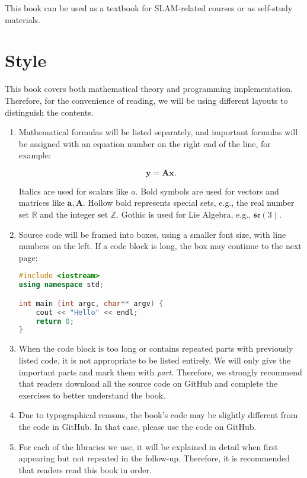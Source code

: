 This book can be used as a textbook for SLAM-related courses or as self-study materials.

\section{Style}
This book covers both mathematical theory and programming implementation. Therefore, for the convenience of reading, we will be using different layouts to distinguish the contents.

\begin{enumerate}
	\item Mathematical formulas will be listed separately, and important formulas will be assigned with an equation number on the right end of the line, for example:
	
	\begin{equation}
	\mathbf{y} =\mathbf{A}\mathbf{x}.
	\end{equation}
	
	Italics are used for scalars like $a$. Bold symbols are used for vectors and matrices like $\mathbf{a}, \mathbf{A}$. Hollow bold represents special sets, e.g., the real number set $\mathbb{R}$ and the integer set $\mathbb{Z}$. Gothic is used for Lie Algebra, e.g., $\mathfrak{se}(3)$.
	
	\item Source code will be framed into boxes, using a smaller font size, with line numbers on the left. If a code block is long, the box may continue to the next page:
\begin{lstlisting}[language=C++,caption=Code example:]
#include <iostream>
using namespace std;

int main (int argc, char** argv) {
	cout << "Hello" << endl;
	return 0;
}
\end{lstlisting}
	
	\item When the code block is too long or contains repeated parts with previously listed code, it is not appropriate to be listed entirely. We will only give the important parts and mark them with \textit{part}. Therefore, we strongly recommend that readers download all the source code on GitHub and complete the exercises to better understand the book.
	
	\item Due to typographical reasons, the book's code may be slightly different from the code in GitHub. In that case, please use the code on GitHub.
	
	\item For each of the libraries we use, it will be explained in detail when first appearing but not repeated in the follow-up. Therefore, it is recommended that readers read this book in order.
	

\end{enumerate}
